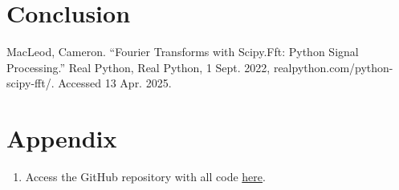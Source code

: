 \documentclass{article}
\begin{document}
\section{Conclusion}

\begin{thebibliography}{9} %
     MacLeod, Cameron. “Fourier Transforms with Scipy.Fft: Python Signal Processing.” Real Python, Real Python, 1 Sept. 2022, realpython.com/python-scipy-fft/. Accessed 13 Apr. 2025. 
\end{thebibliography}

\section{Appendix}
\begin{enumerate}
    \item Access the GitHub repository with all code \href{https://github.com/margheritatonon/approximation-II-assignment}{here}.
\end{enumerate}
\end{document}
